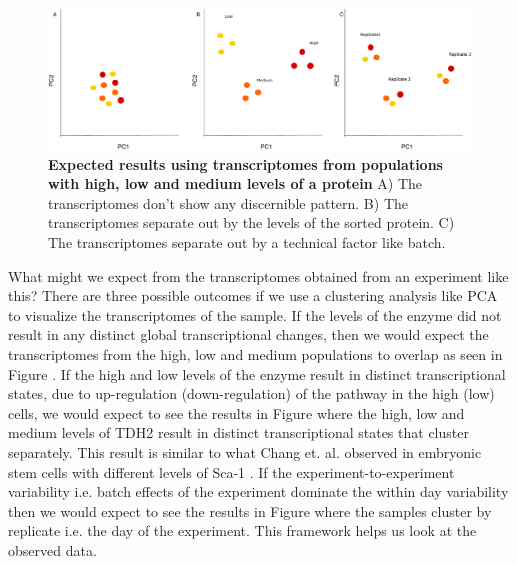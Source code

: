\begin{figure}[t!]  
    \centering
    \includegraphics[width=\linewidth, scale=0.5]{figures/intro/intro_clustering_expectedresults.pdf}
    \caption[Expected results using transcriptomes from populations with high, low and medium levels of a protein]{%
        \textbf{Expected results using transcriptomes from populations with high, low and medium levels of a protein}
        A) The transcriptomes don't show any discernible pattern. B) The transcriptomes separate out by the levels of the sorted protein. C) The transcriptomes separate out by a technical factor like batch.
    }
    \label{fig:intro4}
\end{figure}

What might we expect from the transcriptomes obtained from an experiment like this? There are three possible outcomes if we use a clustering analysis like PCA to visualize the transcriptomes of the sample. If the levels of the enzyme did not result in any distinct global transcriptional changes, then we would expect the transcriptomes from the high, low and medium populations to overlap as seen in Figure . If the high and low levels of the enzyme result in distinct transcriptional states, due to up-regulation (down-regulation) of the pathway in the high (low) cells, we would expect to see the results in Figure  where the high, low and medium levels of TDH2 result in distinct transcriptional states that cluster separately. This result is similar to what Chang et. al. observed in embryonic stem cells with different levels of Sca-1 \cite{chang2008n}. If the experiment-to-experiment variability i.e. batch effects of the experiment dominate the within day variability then we would expect to see the results in Figure  where the samples cluster by replicate i.e. the day of the experiment. This framework helps us look at the observed data.

